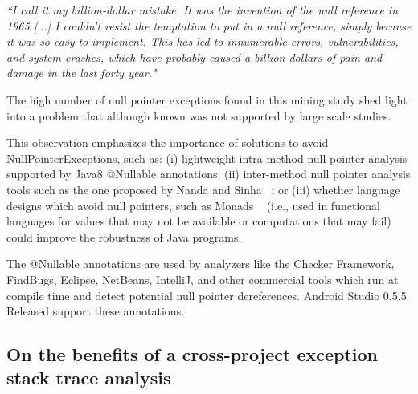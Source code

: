\documentclass[conference]{IEEEtran}
\begin{document}
\emph{``I call it my billion-dollar mistake. It was the invention of the null reference in 1965 [...] I couldn’t resist the temptation to put 
in a null reference, simply because it was so easy to implement. This has led to innumerable errors, vulnerabilities, and system 
crashes, which have probably caused a billion dollars of pain and damage in the last forty year."}

The high number of null pointer exceptions found in this mining study shed light into a problem
that although known was not supported by large scale studies. 

This observation emphasizes the importance of solutions to avoid NullPointerExceptions, such as:
(i) lightweight intra-method null pointer analysis supported by Java8 @Nullable annotations;
(ii) inter-method null pointer analysis tools such as the one proposed by Nanda and Sinha ~\cite{nanda2009accurate};
or (iii) whether language designs which avoid null pointers, such 
as Monads ~\cite{Walde95} (i.e., used in functional languages for values that may not be available 
or computations that may fail) could improve the robustness of Java programs. 

The @Nullable annotations are used by analyzers like the Checker Framework, FindBugs, Eclipse, 
NetBeans, IntelliJ, and other commercial tools which run at compile time and detect potential null 
pointer dereferences. Android Studio 0.5.5 Released support these annotations.




\subsection{On the benefits of a cross-project exception stack trace analysis}  
\end{document}
